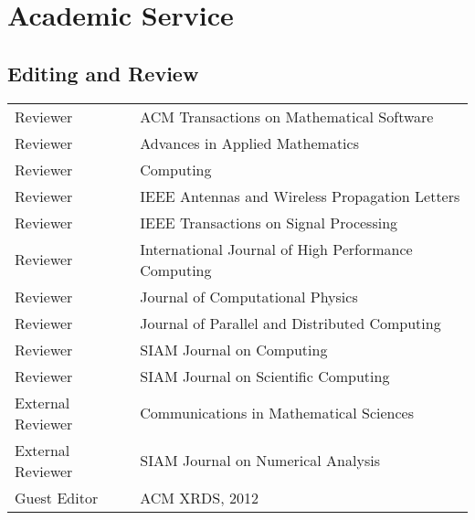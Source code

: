 \documentclass[letterpaper]{article}
\renewenvironment{itemize}{
  \begin{list}{}{
    \setlength{\leftmargin}{1.5em}
  }
}{
  \end{list}
}
\begin{document}
\section*{Academic Service}

\subsection*{Editing and Review}
\begin{tabular}{ll}
Reviewer & ACM Transactions on Mathematical Software \\
Reviewer & Advances in Applied Mathematics \\
Reviewer & Computing \\
Reviewer & IEEE Antennas and Wireless Propagation Letters \\
Reviewer & IEEE Transactions on Signal Processing \\
Reviewer & International Journal of High Performance Computing \\
Reviewer & Journal of Computational Physics \\
Reviewer & Journal of Parallel and Distributed Computing \\
Reviewer & SIAM Journal on Computing \\
Reviewer & SIAM Journal on Scientific Computing \\
External Reviewer & Communications in Mathematical Sciences \\
External Reviewer & SIAM Journal on Numerical Analysis \\
Guest Editor & ACM XRDS, 2012
\end{tabular}
\end{document}
